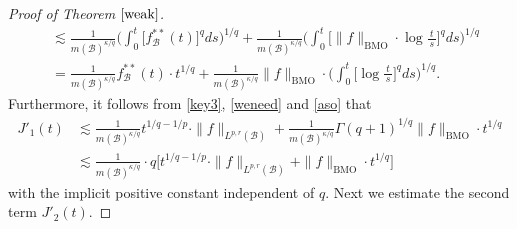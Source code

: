\documentclass{birkjour}
\theoremstyle{definition}
\theoremstyle{remark}
\numberwithin{equation}{section}
\begin{document}
\begin{proof}[Proof of Theorem $\ref{weak}$]
\begin{equation*}
\begin{split}
&\lesssim\frac{1}{m(\mathcal{B})^{\kappa/q}}\bigg(\int_0^{t}\big[f^{**}_{\mathcal{B}}(t)\big]^qds\bigg)^{1/q}
+\frac{1}{m(\mathcal{B})^{\kappa/q}}\bigg(\int_0^{t}\Big[\|f\|_{\mathrm{BMO}}\cdot\log\frac{t}{\,s\,}\Big]^qds\bigg)^{1/q}\\
&=\frac{1}{m(\mathcal{B})^{\kappa/q}}f^{**}_{\mathcal{B}}(t)\cdot t^{1/q}
+\frac{1}{m(\mathcal{B})^{\kappa/q}}\|f\|_{\mathrm{BMO}}\cdot\bigg(\int_0^{t}\Big[\log\frac{t}{\,s\,}\Big]^qds\bigg)^{1/q}.
\end{split}
\end{equation*}
Furthermore, it follows from \eqref{key3}, \eqref{weneed} and \eqref{aso} that
\begin{equation*}
\begin{split}
J'_1(t)&\lesssim \frac{1}{m(\mathcal{B})^{\kappa/q}}t^{1/q-1/p}\cdot\|f\|_{L^{p,r}(\mathcal{B})}
+ \frac{1}{m(\mathcal{B})^{\kappa/q}}\Gamma(q+1)^{1/q}\|f\|_{\mathrm{BMO}}\cdot t^{1/q}\\
&\lesssim  \frac{1}{m(\mathcal{B})^{\kappa/q}}
\cdot q\Big[t^{1/q-1/p}\cdot\|f\|_{L^{p,r}(\mathcal{B})}+\|f\|_{\mathrm{BMO}}\cdot t^{1/q}\Big]
\end{split}
\end{equation*}
with the implicit positive constant independent of $q$. Next we estimate the second term $J'_2(t)$.


\end{proof}
\end{document}
